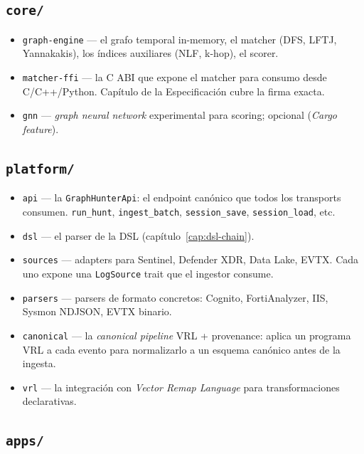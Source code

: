 \subsection{\texttt{core/}}

\begin{itemize}
    \item \texttt{graph-engine} — el grafo temporal in-memory,
    el matcher (DFS, LFTJ, Yannakakis), los índices auxiliares
    (NLF, k-hop), el scorer.
    \item \texttt{matcher-ffi} — la C ABI que expone el matcher para
    consumo desde C/C++/Python. Capítulo de la Especificación
    cubre la firma exacta.
    \item \texttt{gnn} — \emph{graph neural network} experimental
    para scoring; opcional (\emph{Cargo feature}).
\end{itemize}

\subsection{\texttt{platform/}}

\begin{itemize}
    \item \texttt{api} — la \texttt{GraphHunterApi}: el endpoint
    canónico que todos los transports consumen. \texttt{run\_hunt},
    \texttt{ingest\_batch}, \texttt{session\_save},
    \texttt{session\_load}, etc.
    \item \texttt{dsl} — el parser de la DSL (capítulo~\ref{cap:dsl-chain}).
    \item \texttt{sources} — adapters para Sentinel, Defender XDR,
    Data Lake, EVTX. Cada uno expone una \texttt{LogSource} trait
    que el ingestor consume.
    \item \texttt{parsers} — parsers de formato concretos: Cognito,
    FortiAnalyzer, IIS, Sysmon NDJSON, EVTX binario.
    \item \texttt{canonical} — la \emph{canonical pipeline} VRL +
    provenance: aplica un programa VRL a cada evento para
    normalizarlo a un esquema canónico antes de la ingesta.
    \item \texttt{vrl} — la integración con
    \emph{Vector Remap Language} para transformaciones declarativas.
\end{itemize}

\subsection{\texttt{apps/}}

